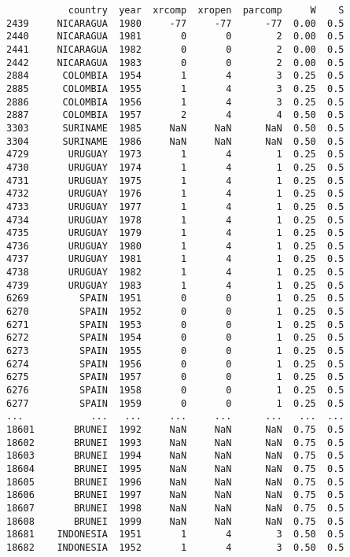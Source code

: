 \documentclass[12pt,fleqn]{article}\usepackage{common}
\begin{document}
\begin{verbatim}
           country  year  xrcomp  xropen  parcomp     W    S
2439     NICARAGUA  1980     -77     -77      -77  0.00  0.5
2440     NICARAGUA  1981       0       0        2  0.00  0.5
2441     NICARAGUA  1982       0       0        2  0.00  0.5
2442     NICARAGUA  1983       0       0        2  0.00  0.5
2884      COLOMBIA  1954       1       4        3  0.25  0.5
2885      COLOMBIA  1955       1       4        3  0.25  0.5
2886      COLOMBIA  1956       1       4        3  0.25  0.5
2887      COLOMBIA  1957       2       4        4  0.50  0.5
3303      SURINAME  1985     NaN     NaN      NaN  0.50  0.5
3304      SURINAME  1986     NaN     NaN      NaN  0.50  0.5
4729       URUGUAY  1973       1       4        1  0.25  0.5
4730       URUGUAY  1974       1       4        1  0.25  0.5
4731       URUGUAY  1975       1       4        1  0.25  0.5
4732       URUGUAY  1976       1       4        1  0.25  0.5
4733       URUGUAY  1977       1       4        1  0.25  0.5
4734       URUGUAY  1978       1       4        1  0.25  0.5
4735       URUGUAY  1979       1       4        1  0.25  0.5
4736       URUGUAY  1980       1       4        1  0.25  0.5
4737       URUGUAY  1981       1       4        1  0.25  0.5
4738       URUGUAY  1982       1       4        1  0.25  0.5
4739       URUGUAY  1983       1       4        1  0.25  0.5
6269         SPAIN  1951       0       0        1  0.25  0.5
6270         SPAIN  1952       0       0        1  0.25  0.5
6271         SPAIN  1953       0       0        1  0.25  0.5
6272         SPAIN  1954       0       0        1  0.25  0.5
6273         SPAIN  1955       0       0        1  0.25  0.5
6274         SPAIN  1956       0       0        1  0.25  0.5
6275         SPAIN  1957       0       0        1  0.25  0.5
6276         SPAIN  1958       0       0        1  0.25  0.5
6277         SPAIN  1959       0       0        1  0.25  0.5
...            ...   ...     ...     ...      ...   ...  ...
18601       BRUNEI  1992     NaN     NaN      NaN  0.75  0.5
18602       BRUNEI  1993     NaN     NaN      NaN  0.75  0.5
18603       BRUNEI  1994     NaN     NaN      NaN  0.75  0.5
18604       BRUNEI  1995     NaN     NaN      NaN  0.75  0.5
18605       BRUNEI  1996     NaN     NaN      NaN  0.75  0.5
18606       BRUNEI  1997     NaN     NaN      NaN  0.75  0.5
18607       BRUNEI  1998     NaN     NaN      NaN  0.75  0.5
18608       BRUNEI  1999     NaN     NaN      NaN  0.75  0.5
18681    INDONESIA  1951       1       4        3  0.50  0.5
18682    INDONESIA  1952       1       4        3  0.50  0.5

\end{verbatim}
\end{document}
